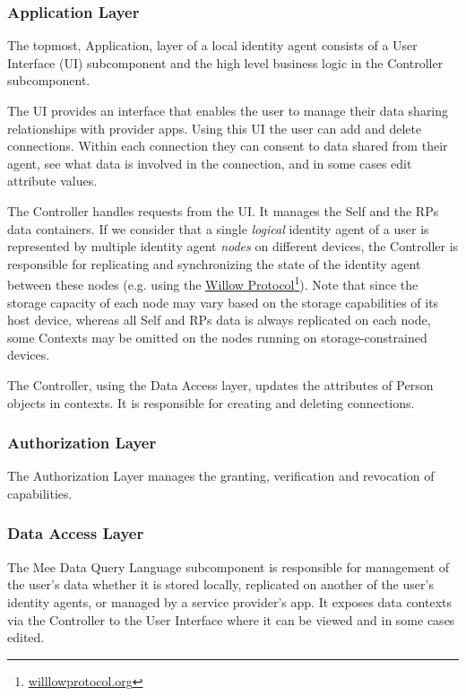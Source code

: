 \documentclass[11pt, oneside]{article}   	%
\newcommand{\hyperfootnote}[1][]{\def\ArgI{{#1}}\hyperfootnoteRelay}
\newcommand\hyperfootnoteRelay[2][]{\href{#1#2}{\ArgI}\footnote{\href{#1#2}{#2}}}
\begin{document}
\subsubsection{Application Layer}

The topmost, Application, layer of a local identity agent consists of a User Interface (UI) subcomponent and the high level business logic in the Controller subcomponent. 

The UI provides an interface that enables the user to manage their data sharing relationships with provider apps. Using this UI the user can add and delete connections. Within each connection they can consent to data shared from their agent, see what data is involved in the connection, and in some cases edit attribute values. 

The Controller handles requests from the UI. It manages the Self and the RPs data containers. If we consider that a single \emph{logical} identity agent of a user is represented by multiple identity agent \emph{nodes} on different devices, the Controller is responsible for replicating and synchronizing the state of the identity agent between these nodes (e.g. using the \hyperfootnote[Willow Protocol][https://]{willlowprotocol.org}). Note that since the storage capacity of each node may vary based on the storage capabilities of its host device, whereas all Self and RPs data is always replicated on each node, some Contexts may be omitted on the nodes running on storage-constrained devices.

The Controller, using the Data Access layer, updates the attributes of Person objects in contexts. It is responsible for creating and deleting connections.

\subsubsection{Authorization Layer}

The Authorization Layer manages the granting, verification and revocation of capabilities. 

\subsubsection{Data Access Layer}

The Mee Data Query Language subcomponent is responsible for management of the user’s data whether it is stored locally, replicated on another of the user's identity agents, or managed by a service provider's app. It exposes data contexts via the Controller to the User Interface where it can be viewed and in some cases edited. 
\end{document}

